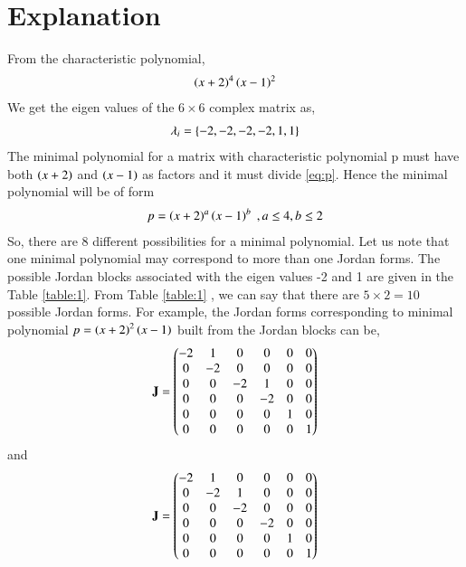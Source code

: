 \documentclass[journal,12pt,twocolumn]{IEEEtran}
\numberwithin{table}{section}
\begin{document}
\section{Explanation}
From the characteristic polynomial,
\begin{align}
\left(x+2\right)^4\left(x-1\right)^2\label{eq:p}
\end{align}
We get the eigen values of the $6\times6$ complex matrix as,
\begin{align}
\lambda_i=\left\{-2,-2,-2,-2,1,1\right\}\label{eq:eig}
\end{align}
The minimal polynomial for a matrix with characteristic polynomial p must have both $\left(x+2\right)$ and $\left(x-1\right)$ as factors and it must divide \eqref{eq:p}. Hence the minimal polynomial will be of form 
\begin{align}
p=\left(x+2\right)^a\left(x-1\right)^b \; ,a\le 4,b\le2
\end{align}
So, there are 8 different possibilities for a minimal polynomial. Let us note that one minimal polynomial may correspond to more than one Jordan forms. The possible Jordan blocks associated with the eigen values -2 and 1 are given in the Table \ref{table:1}. From Table \ref{table:1} , we can say that there are $5\times2=10$ possible Jordan forms.
For example, the Jordan forms corresponding to minimal polynomial $p=\left(x+2\right)^2\left(x-1\right)$ built from the Jordan blocks can be,
\begin{align}
\mathbf{J}=\begin{pmatrix}-2&1&0&0&0&0\\0&-2&0&0&0&0\\0&0&-2&1&0&0\\0&0&0&-2&0&0\\0&0&0&0&1&0\\0&0&0&0&0&1\end{pmatrix}
\end{align}
and
\begin{align}
\mathbf{J}=\begin{pmatrix}-2&1&0&0&0&0\\0&-2&1&0&0&0\\0&0&-2&0&0&0\\0&0&0&-2&0&0\\0&0&0&0&1&0\\0&0&0&0&0&1\end{pmatrix}
\end{align}
\renewcommand{\thetable}{1}
\end{document}
